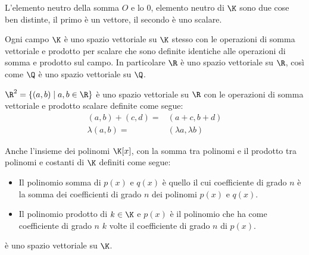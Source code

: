 \begin{observation} L'elemento neutro della somma $O$ e lo $0$, elemento neutro
	di $\K$ sono due cose ben distinte, il primo è un vettore, il secondo è uno
	scalare. \end{observation}

\begin{example} Ogni campo $\K$ è uno spazio vettoriale su $\K$ stesso con le
	operazioni di somma vettoriale e prodotto per scalare che sono definite
	identiche alle operazioni di somma e prodotto sul campo. In particolare $\R$ è
	uno spazio vettoriale su $\R$, così come $\Q$ è uno spazio vettoriale su $\Q$.
\end{example}

\begin{example}
	$\R^2 = \{(a, b) \mid a,b \in \R\}$ è uno spazio vettoriale su $\R$ con le
	operazioni di somma vettoriale e prodotto scalare definite come segue:
	\begin{align*}
		(a,b) + (c,d) =  & (a + c, b + d)         \\
		\lambda (a, b) = & (\lambda a, \lambda b)
	\end{align*}
\end{example}

\begin{example}
	Anche l'insieme dei polinomi $\K[x]$, con la somma tra polinomi e il
	prodotto tra polinomi e costanti di $\K$ definiti come segue:
	\begin{itemize}
		\item Il polinomio somma di $p(x)$ e $q(x)$ è quello il cui coefficiente
		      di grado $n$ è la somma dei coefficienti di grado $n$ dei polinomi
		      $p(x)$ e $q(x)$.
		\item Il polinomio prodotto di $k \in \K$ e $p(x)$ è il polinomio che ha
		      come coefficiente di grado $n$ $k$ volte il coefficiente di grado $n$
		      di $p(x)$.
	\end{itemize}
	è uno spazio vettoriale su $\K$.
\end{example}
